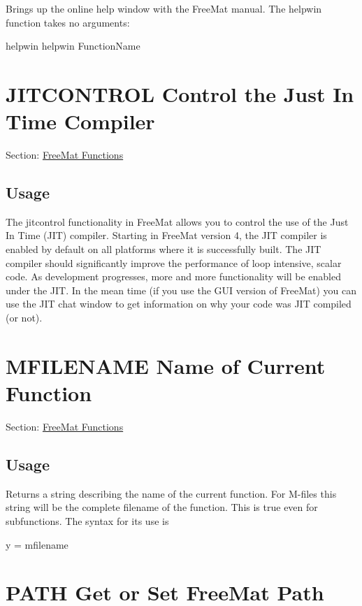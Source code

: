 Brings up the online help window with the Free\-Mat manual. The {\ttfamily helpwin} function takes no arguments\-: \begin{DoxyVerb}  helpwin
  helpwin FunctionName
\end{DoxyVerb}
 \hypertarget{freemat_jitcontrol}{}\section{J\-I\-T\-C\-O\-N\-T\-R\-O\-L Control the Just In Time Compiler}\label{freemat_jitcontrol}
Section\-: \hyperlink{sec_freemat}{Free\-Mat Functions} \hypertarget{vtkwidgets_vtkxyplotwidget_Usage}{}\subsection{Usage}\label{vtkwidgets_vtkxyplotwidget_Usage}
The {\ttfamily jitcontrol} functionality in Free\-Mat allows you to control the use of the Just In Time (J\-I\-T) compiler. Starting in Free\-Mat version 4, the J\-I\-T compiler is enabled by default on all platforms where it is successfully built. The J\-I\-T compiler should significantly improve the performance of loop intensive, scalar code. As development progresses, more and more functionality will be enabled under the J\-I\-T. In the mean time (if you use the G\-U\-I version of Free\-Mat) you can use the J\-I\-T chat window to get information on why your code was J\-I\-T compiled (or not). \hypertarget{freemat_mfilename}{}\section{M\-F\-I\-L\-E\-N\-A\-M\-E Name of Current Function}\label{freemat_mfilename}
Section\-: \hyperlink{sec_freemat}{Free\-Mat Functions} \hypertarget{vtkwidgets_vtkxyplotwidget_Usage}{}\subsection{Usage}\label{vtkwidgets_vtkxyplotwidget_Usage}
Returns a string describing the name of the current function. For M-\/files this string will be the complete filename of the function. This is true even for subfunctions. The syntax for its use is \begin{DoxyVerb}    y = mfilename
\end{DoxyVerb}
 \hypertarget{freemat_path}{}\section{P\-A\-T\-H Get or Set Free\-Mat Path}\label{freemat_path}
